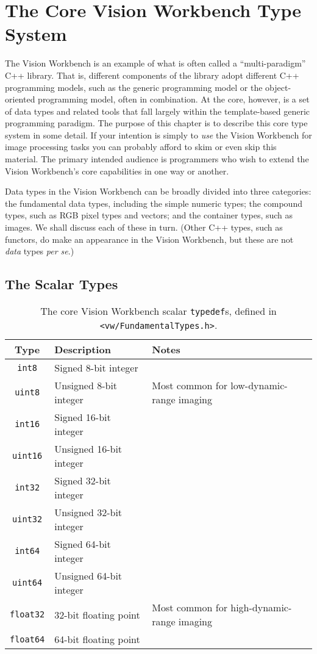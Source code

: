 \chapter{The Core Vision Workbench Type System}

The Vision Workbench is an example of what is often called a
``multi-paradigm'' C++ library.  That is, different components of the
library adopt different C++ programming models, such as the generic
programming model or the object-oriented programming model, often in
combination.  At the core, however, is a set of data types and related
tools that fall largely within the template-based generic programming
paradigm.  The purpose of this chapter is to describe this core type
system in some detail.  If your intention is simply to {\it use} the
Vision Workbench for image processing tasks you can probably afford
to skim or even skip this material.  The primary intended audience is
programmers who wish to extend the Vision Workbench's core
capabilities in one way or another.

Data types in the Vision Workbench can be broadly divided into three
categories: the fundamental data types, including the simple numeric
types; the compound types, such as RGB pixel types and vectors; and
the container types, such as images.  We shall discuss each of these
in turn.  (Other C++ types, such as functors, do make an appearance in
the Vision Workbench, but these are not {\it data} types {\it per se}.)

\section{The Scalar Types}

\begin{table}[t]\begin{centering}
\begin{tabular}{|c|l|l|} \hline
Type & Description & Notes \\ \hline \hline
\verb#int8# & Signed 8-bit integer & \\ \hline
\verb#uint8# & Unsigned 8-bit integer & Most common for low-dynamic-range imaging \\ \hline
\verb#int16# & Signed 16-bit integer & \\ \hline
\verb#uint16# & Unsigned 16-bit integer & \\ \hline
\verb#int32# & Signed 32-bit integer & \\ \hline
\verb#uint32# & Unsigned 32-bit integer & \\ \hline
\verb#int64# & Signed 64-bit integer & \\ \hline
\verb#uint64# & Unsigned 64-bit integer & \\ \hline
\verb#float32# & 32-bit floating point & Most common for high-dynamic-range imaging \\ \hline
\verb#float64# & 64-bit floating point & \\ \hline
\end{tabular}
\caption{The core Vision Workbench scalar {\tt typedef}s, defined in {\tt <vw/FundamentalTypes.h>}.}
\label{tbl:scalar-types}
\end{centering}\end{table}


